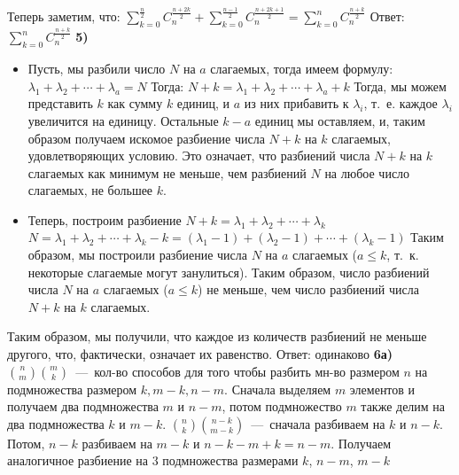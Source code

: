 \documentclass[12pt,a4paper,fleqn]{article}
\begin{document}
Теперь заметим, что: $\sum_{k = 0}^{\frac{n}{2}} C_n^{\frac{n + 2k}{2}} + \sum_{k = 0}^{\frac{n - 1}{2}} C_n^{\frac{n + 2k + 1}{2}} = \sum_{k = 0}^n C_n^{\frac{n + k}{2}}$ \newline
Ответ: $\sum_{k = 0}^n C_n^{\frac{n + k}{2}}$ \newpage
{\bf 5)} 
\begin{itemize}
\item Пусть, мы разбили число $N$ на $a$ слагаемых, тогда имеем формулу: $\lambda_1 + \lambda_2 + \cdots + \lambda_a = N$ \newline
Тогда: $N + k = \lambda_1 + \lambda_2 + \cdots + \lambda_a + k$ \newline
Тогда, мы можем представить $k$ как сумму $k$ единиц, и $a$ из них прибавить к $\lambda_i$, т.~е. каждое $\lambda_i$ увеличится на единицу. Остальные $k -a$ единиц мы оставляем, и, таким образом получаем искомое разбиение числа $N + k$ на $k$ слагаемых, удовлетворяющих условию. Это означает, что разбиений числа $N + k$ на $k$ слагаемых как минимум не меньше, чем разбиений $N$ на любое число слагаемых, не большее $k$. 
\item Теперь, построим разбиение $N + k = \lambda_1 + \lambda_2 + \cdots + \lambda_k$ \newline
$N = \lambda_1 + \lambda_2 + \cdots + \lambda_k - k = (\lambda_1 - 1) + (\lambda_2 - 1) + \cdots + (\lambda_k - 1)$ \newline
Таким образом, мы построили разбиение числа $N$ на $a$ слагаемых ($a \leqslant k$, т.~к. некоторые слагаемые могут занулиться). Таким образом, число разбиений числа $N$ на $a$ слагаемых ($a \leqslant k$) не меньше, чем число разбиений числа $N + k$ на $k$ слагаемых.
\end{itemize}
Таким образом, мы получили, что каждое из количеств разбиений не меньше другого, что, фактически, означает их равенство. \newline
Ответ: одинаково \newline \newline
{\bf 6а)} $\displaystyle \binom{n}{m}\binom{m}{k}$~---~кол-во способов для того чтобы разбить мн-во размером $n$ на подмножества размером $k, m - k, n - m$. Сначала выделяем $m$ элементов и получаем два подмножества $m$ и $n - m$, потом подмножество $m$ также делим на два подмножества $k$ и $m - k$. \newline
$\displaystyle \binom{n}{k}\binom{n - k}{m - k}$~---~сначала разбиваем на $k$  и $n - k$. Потом, $n - k$ разбиваем на $m - k$ и $n - k -m + k = n - m$. Получаем аналогичное разбиение на $3$  подмножества размерами $k$, $n - m$, $m - k$ \newline
\end{document}
